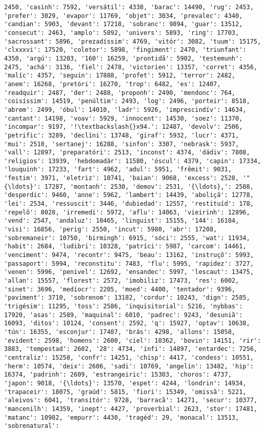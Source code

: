 \documentclass[11pt]{article}
\begin{document}
\begin{Verbatim}[commandchars=\\\{\}]
2450, 'casinh': 7592, 'versátil': 4338, 'barac': 14490, 'rug': 2453, 'prefer': 3029, 'evapor': 11769, 'objet': 3034, 'prevalec': 4340, 'candian': 5903, 'devant': 17218, 'sobranc': 9894, 'guar': 13512, 'consecut': 2463, 'amplo': 5892, 'univers': 5893, 'ring': 17703, 'sacrossant': 5896, 'prezadíssim': 4769, 'vitór': 3082, 'tuum': 15175, 'clxxxvi': 17520, 'coletor': 5898, 'fingiment': 2470, 'triunfant': 4350, 'argú': 13203, '160': 16259, 'prontidã': 5902, 'testemunh': 2475, 'achá': 3136, 'fiel': 2478, 'victorien': 13357, 'corret': 4356, 'malíc': 4357, 'seguin': 17888, 'profet': 5912, 'terror': 2482, 'anem': 16268, 'pretóri': 16270, 'trop': 6482, 'es': 12407, 'readquir': 2487, 'der': 2488, 'proponh': 2490, 'mendonc': 764, 'coisíssim': 14519, 'penúltim': 2493, 'log': 2496, 'porteir': 8518, 'abrem': 2499, 'óbul': 14010, 'ladr': 5926, 'imprescindív': 14634, 'cantant': 14198, 'voav': 5929, 'innocent': 14530, 'soez': 11370, 'incompar': 9197, '!\textbackslash{}x94.': 12487, 'devolv': 2506, 'petrific': 3289, 'declíni': 13748, 'giraf': 5932, 'lucr': 4371, 'mui': 2510, 'sertanej': 16288, 'sinfon': 3307, 'nebrask': 5937, 'vall': 12897, 'preparatóri': 2513, 'inconst': 4374, 'dádiv': 7808, 'religios': 13939, 'hebdomadár': 11580, 'óscul': 4379, 'capin': 17334, 'louquinh': 17233, 'fart': 4962, 'adul': 5951, 'frêmit': 9031, 'festim': 3971, 'eletriz': 10741, 'baian': 9068, 'excess': 2528, '"{\ldots}': 17287, 'montanh': 2530, 'demov': 2531, '{\ldots},': 2508, 'desperdic': 9460, 'anne': 5962, 'lambert': 14439, 'aboliçã': 12778, 'lei': 2534, 'ressuscit': 3446, 'dubiedad': 12557, 'restituíd': 178, 'repelõ': 8028, 'irremedi': 5972, 'aflu': 14063, 'vieirinh': 12896, 'vend': 2547, 'andaluz': 10465, 'linguist': 15155, '144': 16184, 'visi': 16856, 'perig': 2550, 'incut': 5980, 'abr': 17208, 'sobremaneir': 10750, 'birmingh': 6915, 'sóci': 2555, 'wat': 11934, 'habit': 2684, 'ludibri': 10328, 'patríci': 5987, 'carcom': 14461, 'venciment': 9474, 'recontr': 9475, 'beau': 13162, 'instruçõ': 5993, 'passaport': 5994, 'reconstitu': 7483, 'flu': 5995, 'rapidez': 3727, 'venen': 5996, 'penivel': 12692, 'ensandec': 5997, 'lescaut': 13475, 'allan': 15557, 'florest': 2572, 'imobiliz': 17473, 'res': 6002, 'sinet': 3696, 'medíocr': 2205, 'moed': 4400, 'tentador': 9396, 'paviment': 3710, 'sobrenom': 13182, 'cordur': 10243, 'dign': 2585, 'trigésim': 11295, 'toss': 2586, 'inquisitorial': 5216, 'nybbas': 17920, 'asas': 2589, 'maquinal': 6010, 'padrec': 9243, 'desuniã': 16093, 'ditos': 10124, 'consent': 2592, 'q': 15927, 'optav': 10638, 'tún': 16355, 'esconjur': 17407, 'brás': 4298, 'allons': 15058, 'evident': 2598, 'homens': 2600, 'ciel': 10362, 'bovin': 14151, 'rir': 3883, 'tempestad': 2602, '28': 4734, 'infi': 14897, 'entardec': 7256, 'centraliz': 15258, 'confr': 14251, 'chisp': 4417, 'condess': 10551, 'herm': 10574, 'deix': 2606, 'sadi': 10769, 'angelin': 13482, 'hip': 16374, 'padrinh': 2609, 'estrangeiric': 15303, 'choros': 4737, 'japon': 9018, '{\ldots}': 13570, 'espet': 4244, 'londrin': 14934, 'trapaceir': 18075, 'graúd': 5815, 'fiori': 15349, 'omissã': 5221, 'aleivos': 6041, 'transitór': 9728, 'barracã': 14271, 'secur': 10377, 'mancenilh': 14359, 'inept': 4427, 'proverbial': 2623, 'stor': 17481, 'matanc': 10982, 'empurr': 4430, 'tragéd': 29, 'monacal': 13513, 'sobrenatural': 
\end{Verbatim}
\end{document}
